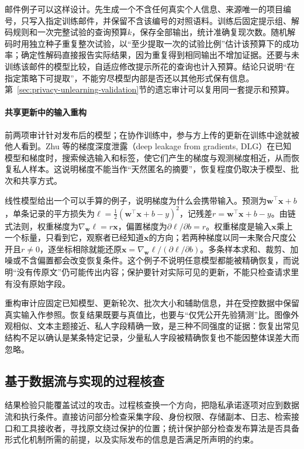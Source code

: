 邮件例子可以这样设计。先生成一个不含任何真实个人信息、来源唯一的项目编号，只写入指定训练邮件，并保留不含该编号的对照语料。训练后固定提示组、解码规则和一次完整试验的查询预算$k$，保存全部输出，统计准确复现次数。随机解码时用独立种子重复整次试验，以“至少提取一次的试验比例”估计该预算下的成功率；确定性解码直接报告实际结果，因为重复得到相同输出不增加证据。还要与未训练该邮件的模型比较，自适应修改提示所花的查询也计入预算。结论只说明“在指定策略下可提取”，不能穷尽模型内部是否还以其他形式保有信息。第~\ref{sec:privacy-unlearning-validation}节的遗忘审计可以复用同一套提示和预算。

\paragraph{共享更新中的输入重构}

前两项审计针对发布后的模型；在协作训练中，参与方上传的更新在训练中途就被他人看到。Zhu 等的梯度深度泄露（deep leakage from gradients, DLG）在已知模型和梯度时，搜索候选输入和标签，使它们产生的梯度与观测梯度相近，从而恢复私人样本。这说明梯度不能当作“天然匿名的摘要”，恢复程度仍取决于模型、批次和共享方式。

线性模型给出一个可以手算的例子，说明梯度为什么会携带输入。预测为$\bm w^\top\bm x+b$，单条记录的平方损失为$\ell=\tfrac12(\bm w^\top\bm x+b-y)^2$，记残差$r=\bm w^\top\bm x+b-y$。由链式法则，权重梯度为$\nabla_{\bm w}\ell=r\bm x$，偏置梯度为$\partial\ell/\partial b=r$。权重梯度是输入$\bm x$乘上一个标量，只看到它，观察者已经知道$\bm x$的方向；若两种梯度以同一未聚合尺度公开且$r\ne0$，逐坐标相除就能还原$\bm x=\nabla_{\bm w}\ell/(\partial\ell/\partial b)$。多条样本求和、裁剪、加噪或不含偏置都会改变恢复条件。这个例子不说明任意模型都能被精确恢复，而说明“没有传原文”仍可能传出内容；保护要针对实际可见的更新，不能只检查请求里有没有原始字段。

重构审计应固定已知模型、更新轮次、批次大小和辅助信息，并在受控数据中保留真实输入作参照。恢复结果既要与真值比，也要与“仅凭公开先验猜测”比。图像外观相似、文本主题接近、私人字段精确一致，是三种不同强度的证据：恢复出常见结构不足以确认是某条特定记录，少量私人字段被精确恢复也不能因整体误差大而忽略。

\subsection{基于数据流与实现的过程核查}
\label{sec:privacy-implementation-verification}

结果检验只能覆盖试过的攻击。过程核查换一个方向，把隐私承诺逐项对应到数据流和执行条件。直接访问部分检查采集字段、身份权限、存储副本、日志、检索接口和工具接收者，寻找原文绕过保护的位置；统计保护部分检查发布算法是否具备形式化机制所需的前提，以及实际发布的信息是否满足所声明的约束。

